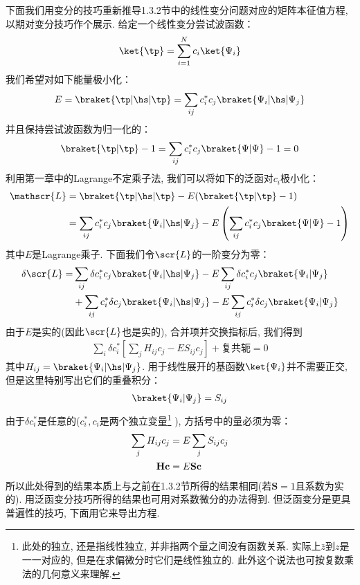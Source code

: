 下面我们用变分的技巧重新推导1.3.2节中的线性变分问题对应的矩阵本征值方程, 
以期对变分技巧作个展示. 
给定一个线性变分尝试波函数：
\begin{align}
	\ket{\tp} = \sum_{i=1}^{N}c_i\ket{\Psi_i}
\end{align}
我们希望对如下能量极小化：
\begin{align}
	E = \braket{\tp|\hs|\tp} = \sum_{ij} c_i^*c_j\braket{\Psi_i|\hs|\Psi_j}
\end{align}
并且保持尝试波函数为归一化的：
\begin{align}
	\braket{\tp|\tp} - 1 = \sum_{ij}c_i^*c_j \braket{\Psi|\Psi} - 1 = 0
\end{align}
利用第一章中的Lagrange不定乘子法, 
我们可以将如下的泛函对$c_i$极小化：
\begin{align}
	\mathscr{L} & = \braket{\tp|\hs|\tp} - E(\braket{\tp|\tp}-1) \notag\\
	& = \sum_{ij}c_i^*c_j\braket{\Psi_i|\hs|\Psi_j} - E\left( \sum_{ij}c_i^*c_j \braket{\Psi|\Psi} - 1 \right)
\end{align}
其中$E$是Lagrange乘子. 
下面我们令$\scr{L}$的一阶变分为零：
\begin{align}
	\delta\scr{L} = & \sum_{ij}\delta c_i^*c_j\braket{\Psi_i|\hs|\Psi_j} - E\sum_{ij}\delta c_i^*c_j\braket{\Psi_i|\Psi_j} \notag \\
	& +  \sum_{ij}c_i^*\delta c_j\braket{\Psi_i|\hs|\Psi_j} - E\sum_{ij}c_i^*\delta c_j\braket{\Psi_i|\Psi_j}
\end{align}
由于$E$是实的(因此$\scr{L}$也是实的), 
合并项并交换指标后, 
我们得到
\begin{align}
	\sum_i\delta c_i^*\left[ \sum_j H_{ij}c_j - ES_{ij}c_j \right] + \text{复共轭} = 0
\end{align}
其中$H_{ij} = \braket{\Psi_i|\hs|\Psi_j}$. 
用于线性展开的基函数$\ket{\Psi_i}$并不需要正交, 
但是这里特别写出它们的重叠积分：
\begin{align}
	\braket{\Psi_i|\Psi_j} = S_{ij}
\end{align}
由于$\delta c_i^*$是任意的($c_i^*,c_i$是两个独立变量\footnote{
	此处的独立, 还是指线性独立, 并非指两个量之间没有函数关系. 
	实际上$\bar{z}$到$z$是一一对应的, 但是在求偏微分时它们是线性独立的. 
	此外这个说法也可按复数乘法的几何意义来理解.}
), 方括号中的量必须为零：
\begin{align}
	\sum_j H_{ij}c_j & = E \sum_j S_{ij}c_j \notag\\
	\mathbf{Hc} & = E\mathbf{Sc}
\end{align}
所以此处得到的结果本质上与之前在1.3.2节所得的结果相同(若$\mathbf{S}=1$且系数为实的). 
用泛函变分技巧所得的结果也可用对系数微分的办法得到. 
但泛函变分是更具普遍性的技巧, 
下面用它来导出\hft 方程. 

